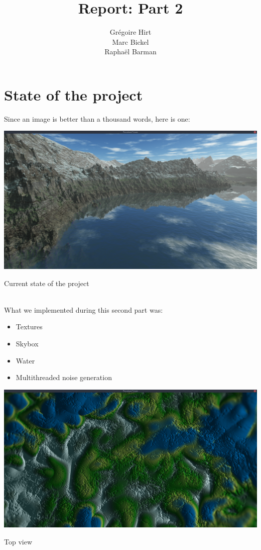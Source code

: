 \documentclass[11pt]{article}
\begin{document}
\setlength{\parindent}{0pt}
%
\author{Grégoire Hirt\\ Marc Bickel\\ Raphaël Barman}
\title{\vspace{-2.0cm}Report: Part 2}
\maketitle
\vspace{-1cm}
\section{State of the project}
Since an image is better than a thousand words, here is one:
\begin{center}
\includegraphics[width=\textwidth]{screen04}
\caption{Current state of the project}
\end{center} \\

What we implemented during this second part was:
\begin{itemize}
\item Textures
\item Skybox
\item Water
\item Multithreaded noise generation
\end{itemize}

\begin{center}
\includegraphics[width=\textwidth]{screen02}
\caption{Top view}
\end{center} 
\end{document}
